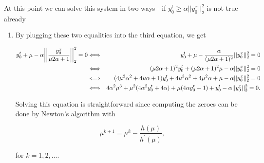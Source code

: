                 At this point we can solve this system in two ways - if $y_{0}^{t} \ge \alpha ||y_{0}^{x}||_{2}^{2}$ is not true already
                \begin{enumerate}
                    \item By plugging these two equalities into the third equation, we get

                \begin{eqnarray}
                    y_{0}^{t} + \mu - \alpha \bigg|\bigg|\frac{y_{0}^{x}}{\mu 2 \alpha + 1}\bigg|\bigg|_{2}^{2} = 0 &\Longleftrightarrow& y_{0}^{t} + \mu - \frac{\alpha}{(\mu 2 \alpha + 1)^{2}} ||y_{0}^{x}||_{2}^{2} = 0 \notag \\
                    &\Longleftrightarrow& (\mu 2 \alpha + 1)^{2} y_{0}^{t} + (\mu 2 \alpha + 1)^{2} \mu - \alpha ||y_{0}^{x}||_{2}^{2} = 0 \notag \\
                    &\Longleftrightarrow& (4 \mu^{2} \alpha^{2} + 4 \mu \alpha + 1) y_{0}^{t} + 4 \mu^{3} \alpha^{2} + 4 \mu^{2} \alpha + \mu - \alpha ||y_{0}^{x}||_{2}^{2} = 0 \notag \\
                    &\Longleftrightarrow& 4 \alpha^{2} \mu^{3} + \mu^{2} (4 \alpha^{2} y_{0}^{t} + 4 \alpha) + \mu (4 \alpha y_{0}^{t} + 1) + y_{0}^{t} - \alpha ||y_{0}^{x}||_{2}^{2} = 0. \notag
                \end{eqnarray}

                Solving this equation is straightforward since computing the zeroes can be done by Newton's algorithm with

                \begin{equation}
                    \mu^{k+1} = \mu^{k} - \frac{h(\mu)}{h^{'}(\mu)}, \label{eq:newton}
                \end{equation}

                for $k = 1, 2, ...$.


\end{enumerate}

